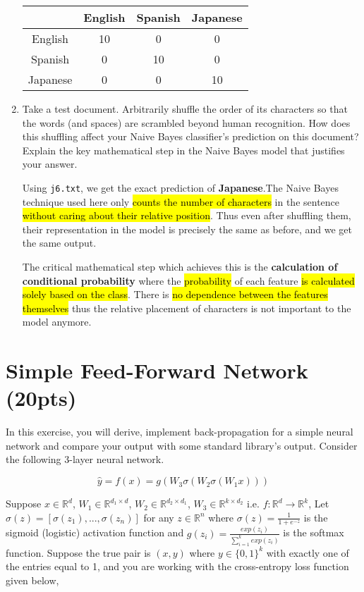 \documentclass[a4paper]{article}
\theoremstyle{definition}
\newenvironment{soln}{
    \leavevmode\color{blue}\ignorespaces
}{}
\begin{document}
\begin{enumerate}
\begin{soln}
    \begin{center}
        \begin{tabular}{c|ccc}
            & English & Spanish & Japanese \\
            \hline
            English&10&0&0\\
            Spanish&0&10&0\\
            Japanese&0&0&10
        \end{tabular}
    \end{center}
\end{soln}

\item Take a test document.   Arbitrarily shuffle the order of its characters so that the words (and spaces) are scrambled beyond human recognition.  How does this shuffling affect your Naive Bayes classifier's prediction on this document?  Explain the key mathematical step in the Naive Bayes model that justifies your answer.\\
\begin{soln}
    Using \texttt{j6.txt}, we get the exact prediction of \textbf{Japanese}.The Naive Bayes technique used here only \hl{counts the number of characters} in the sentence \hl{without caring about their relative position}. Thus even after shuffling them, their representation in the model is precisely the same as before, and we get the same output.

    The critical mathematical step which achieves this is the \textbf{calculation of conditional probability} where the \hl{probability} of each feature \hl{is calculated solely based on the class}. There is \hl{no dependence between the features themselves} thus the relative placement of characters is not important to the model anymore.
\end{soln}

\end{enumerate}

\section{Simple Feed-Forward Network (20pts)}
In this exercise, you will derive, implement back-propagation for a simple neural network and compare your output with some standard library’s output. Consider the following 3-layer neural network.

\[
\hat{y} = f(x) = g(W_3\sigma(W_2\sigma(W_1x)))
\]

Suppose $x \in \mathbb{R}^d$, $W_1 \in \mathbb{R}^{d_1 \times d}$, $W_2 \in \mathbb{R}^{d_2 \times d_1}$, $W_3 \in \mathbb{R}^{k \times d_2}$ i.e. $f: \mathbb{R}^d \rightarrow \mathbb{R}^k$, Let $\sigma(z) = [\sigma(z_1), ..., \sigma(z_n)]$ for any $z \in \mathbb{R}^n$ where $\sigma(z) = \frac{1}{1 + e^{-z}}$ is the sigmoid (logistic) activation function and $g(z_i) = \frac{exp(z_i)}{\sum_{i=1}^k exp(z_i)}$ is the softmax function. Suppose the true pair is $(x, y)$ where $y \in \{0, 1\}^k$ with exactly one of the entries equal to 1, and you are working with the cross-entropy loss function given below,
\end{document}
